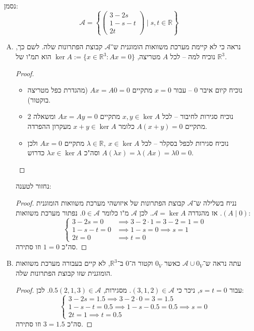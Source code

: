 \documentclass[]{article}
\newcommand\R     {\mathbb{R}}
\newcommand\ac    {\mathcal{A}}
\newcommand\co        {\colon}
\newcommand\pms[1]    {\begin{pmatrix}
		#1
\end{pmatrix}}
\renewcommand\lg      {\lambda}
\newcommand\ccb[1]    {\left \{ #1 \right \}}
\theoremstyle{definition}
\begin{document}
	\section{}
	נסמן: 
	\[ \ac = \ccb{\pms{3 - 2s \\ 1 - s - t \\ 2t} \mid s, t \in \R} \]
	\begin{enumerate}[(A)]
		\item נראה כי לא קיימת מערכת משוואות הומוגנית ש־$\ac$ קבוצת הפתרונות שלה. לשם כך, נוכיח למה – לכל $A$ מטריצה, $\ker A := \{x \in \R^3 \co Ax = 0\}$ הוא תמ"ו של $\R^3$. \begin{proof}\,
			\begin{itemize}
				\item נוכיח קיום איבר $0$ – עבור $x = 0$ מתקיים $Ax = A0 = 0$ (מהגדרת כפל מטריצה בוקטור). 
				\item נוכיח סגירות לחיבור – לכל $x, y \in \ker A$ מתקיים $Ax = Ay = 0$ ומשאלה 2 מתקיים $A(x + y) = 0$ כלומר $x + y \in \ker A$ מעקרון ההפרדה. 
				\item נוכיח סגירות לכפל בסקלר – לכל $\lg \in \R, \ x \in \ker A$ מתקיים $Ax = 0$ ולכן $A(\lg x) = \lg (Ax) = \lg 0 = 0$ וסה"כ $\lg x \in \ker A$ כדרוש. 
			\end{itemize}
		\end{proof}
		נחזור לטענה: 
		\begin{proof}
			נניח בשלילה ש־$\ac$ קבוצת הפתרונות של איזושהי מערכת משוואות הומוגנית $(A \mid 0)$. אז מהגדרה $\ac = \ker A$. לכן $\ac$ מ"ו כלומר $0 \in \ac$. נפתור מערכת משוואות: 
			\[ \begin{cases}
				3 - 2s = 0 &\implies 3 - 2 \cdot 1 = 3 - 2 = 1 = 0 \\
				1 - s - t = 0 &\implies 1 - s = 0 \implies s = 1 \\
				2t = 0 &\implies t = 0
			\end{cases} \]
			סה"כ $1 = 0$ וזו סתירה. 
		\end{proof}
		\item עתה נראה ש־$\ac \cup 0_V$ כאשר $0_V$ וקטור ה־$0$ ב־$\R^3$, לא קיים בעבורה מערכת משוואות הומוגנית שזו קבוצת הפתרונות שלה. \begin{proof}
			עבור $s = t = 0$, ניכר כי $(3, 1, 2) \in \ac$. מסגירות, $0.5(2, 1, 3) \in \ac$. לכן: 
			\[ \begin{cases}
				3 - 2s = 1.5 \implies 3 - 2 \cdot 0 = 3 = 1.5 \\
				1 - s - t = 0.5 \implies 1 - s - 0.5 = 0.5 \implies s = 0 \\
				2t = 1 \implies t = 0.5
			\end{cases} \]
			סה"כ $3 = 1.5$ וזו סתירה. 
		\end{proof}
	\end{enumerate}
	
\end{document}
